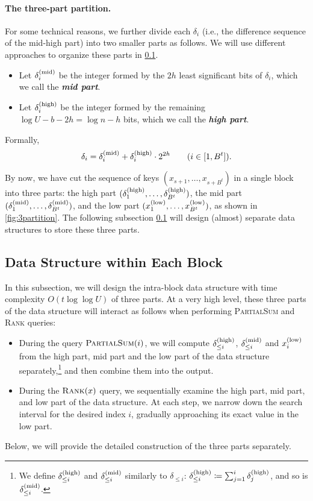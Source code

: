 \documentclass{article}
\theoremstyle{plain}
\theoremstyle{definition}  \newtheorem{definition}[theorem]{Definition}
\DeclarePairedDelimiter{\bk}{(}{)}
\newcommand{\defeq}{\coloneqq}
\newcommand{\xlow}[1][i]{x_{#1}^{(\textup{low})}}
\newcommand{\deltamid}[1][i]{\delta_{#1}^{(\textup{mid})}}
\newcommand{\deltahigh}[1][i]{\delta_{#1}^{(\textup{high})}}
\newcommand{\height}{h}
\newcommand{\rank}{\textup{\textsc{Rank}}\xspace}
\newcommand{\partialsum}{\textup{\textsc{PartialSum}}\xspace}
\newcommand{\defn}[1]{\emph{\textbf{#1}}}
\begin{document}
\paragraph*{The three-part partition.}
For some technical reasons, we further divide each $\delta_i$ (i.e., the difference sequence of the mid-high part) into two smaller parts as follows. We will use different approaches to organize these parts in \cref{sec:simple/ds}.
\begin{itemize}
\item Let $\deltamid$ be the integer formed by the $2h$ least significant bits of $\delta_i$, which we call the \defn{mid part}.
\item Let $\deltahigh$ be the integer formed by the remaining $\log U - b - 2h = \log n - h$ bits, which we call the \defn{high part}.
\end{itemize}
Formally,
\[\delta_i = \deltamid + \deltahigh \cdot 2^{2\height} \qquad (i \in [1, B^t]).\]

By now, we have cut the sequence of keys $(x_{s+1}, \ldots, x_{s+B^t})$ in a single block into three parts: the high part $\bk{\deltahigh[1], \ldots, \deltahigh[B^t]}$, the mid part $\bk{\deltamid[1], \ldots, \deltamid[B^t]}$, and the low part $\bk{\xlow[1], \ldots, \xlow[B^t]}$, as shown in \cref{fig:3partition}. The following subsection \ref{sec:simple/ds} will design (almost) separate data structures to store these three parts.

\subsection{Data Structure within Each Block}
\label{sec:simple/ds}
In this subsection, we will design the intra-block data structure with time complexity $O(t \log \log U)$ of three parts.
At a very high level, these three parts of the data structure will interact as follows when performing \partialsum and \rank queries:
\begin{itemize}
  \item During the query $\partialsum(i)$, we will compute $\deltahigh[\le i]$, $\deltamid[\le i]$ and $\xlow$ from the high part, mid part and the low part of the data structure separately,\footnote{We define $\deltahigh[\le i]$ and $\deltamid[\le i]$ similarly to $\delta_{\le i}$: $\deltahigh[\le i] \defeq \sum_{j=1}^{i} \deltahigh[j]$, and so is $\deltamid[\le i]$.}
  and then combine them into the output.
  \item During the $\rank(x)$ query, we sequentially examine the high part, mid part, and low part of the data structure. At each step, we narrow down the search interval for the desired index $i$, gradually approaching its exact value in the low part.
\end{itemize}
Below, we will provide the detailed construction of the three parts separately.
\end{document}
